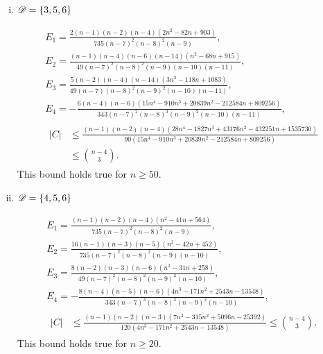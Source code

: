 \documentclass{amsart}
\begin{document}
{\begin{enumerate}[(i)]
\begin{gather*}
E_1=\frac{n(n-3)(n-4)\left(3n^2-161n+1930\right)}{245(n-7)^2(n-8)(n-9)(n-10)},\\ 
E_2=\frac{3n(n-4)(n-5)\left(3n^2-103n+910\right)}{49(n-7)^2(n-8)(n-9)(n-10)(n-11)},\\ 
E_3=\frac{24(n-3)(n-4)\left(n^4-70n^3+1974n^2-24815n+112850\right)}{245(n-7)^2(n-8)(n-9)^2(n-10)^2(n-11)},\\
E_4=-\frac{24(n-4)(n-5)\left(n^4-68n^3+1664n^2-17557n+67710\right)}{35(n-7)^3(n-8)(n-9)^2(n-10)^2(n-11)},\\
\begin{aligned}
|C| &\le \frac{n(n-3)(n-4)\left(3n^4-200n^3+4773n^2-48316n+176580\right)}{168\left(n^4-68n^3+1664n^2-17557n+67710\right)} \leq \binom{n-4}{3}.
\end{aligned}
\end{gather*}
This bound holds true for $n\ge 36.$

\item $\mathscr{D}=\{3,5,6\}$

\begin{gather*}
E_1=\frac{2(n-1)(n-2)(n-4)\left(2n^2-82n+903\right)}{735(n-7)^2(n-8)^2(n-9)},\\ 
E_2=\frac{(n-1)(n-4)(n-6)(n-14)\left(n^2-68n+915\right)}{49(n-7)^2(n-8)^2(n-9)(n-10)(n-11)},\\ 
E_3=\frac{5(n-2)(n-4)(n-14)\left(3n^2-118n+1083\right)}{49(n-7)(n-8)^2(n-9)^2(n-10)(n-11)},\\
E_4=-\frac{6(n-4)(n-6)\left(15n^4-910n^3+20839n^2-212584n+809256\right)}{343(n-7)^2(n-8)^3(n-9)^2(n-10)(n-11)},\\
\begin{aligned}
|C| &\le \frac{(n-1)(n-2)(n-4)\left(28n^4-1827n^3+43176n^2-432251n+1535730\right)}{90\left(15n^4-910n^3+20839n^2-212584n+809256\right)}\\
& \leq \binom{n-4}{3}.
\end{aligned}
\end{gather*}
This bound holds true for $n\ge 50.$

\item $\mathscr{D}=\{4,5,6\}$

\begin{gather*}
E_1=\frac{(n-1)(n-2)(n-4)\left(n^2-41n+564\right)}{735(n-7)^2(n-8)^2(n-9)},\\ 
E_2=\frac{16(n-1)(n-3)(n-5)\left(n^2-42n+452\right)}{735(n-7)^2(n-8)^2(n-9)(n-10)},\\ 
E_3=\frac{8(n-2)(n-3)(n-6)\left(n^2-31n+258\right)}{49(n-7)^2(n-8)^2(n-9)^2(n-10)},\\
E_4=-\frac{8(n-4)(n-5)(n-6)\left(4n^3-171n^2+2543n-13548\right)}{343(n-7)^3(n-8)^3(n-9)^2(n-10)},\\
\begin{aligned}
|C| &\le \frac{(n-1)(n-2)(n-3)\left(7n^3-315n^2+5096n-25392\right)}{120\left(4n^3-171n^2+2543n-13548\right)} \leq \binom{n-4}{3}.
\end{aligned}
\end{gather*}
This bound holds true for $n\ge 20.$


\end{enumerate}}
\end{document}
